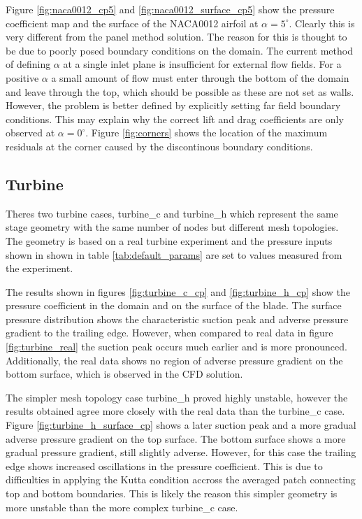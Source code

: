 \documentclass{article}
\begin{document}
Figure \ref{fig:naca0012_cp5} and \ref{fig:naca0012_surface_cp5} show the pressure coefficient map and the surface of the NACA0012 airfoil at $\alpha = 5^\circ$.
Clearly this is very different from the panel method solution.
The reason for this is thought to be due to poorly posed boundary conditions on the domain.
The current method of defining $\alpha$ at a single inlet plane is insufficient for external flow fields.
For a positive $\alpha$ a small amount of flow must enter through the bottom of the domain and leave through the top, which should be possible as these are not set as walls.
However, the problem is better defined by explicitly setting far field boundary conditions.
This may explain why the correct lift and drag coefficients are only observed at $\alpha = 0^\circ$.
Figure \ref{fig:corners} shows the location of the maximum residuals at the corner caused by the discontinous boundary conditions.

\subsection{Turbine}

Theres two turbine cases, turbine\_c and turbine\_h which represent the same stage geometry with the same number of nodes but different mesh topologies.
The geometry is based on a real turbine experiment \cite{4A3_lab} and the pressure inputs shown in shown in table \ref{tab:default_params} are set to values measured from the experiment. 

The results shown in figures \ref{fig:turbine_c_cp} and \ref{fig:turbine_h_cp} show the pressure coefficient in the domain and on the surface of the blade.
The surface pressure distribution shows the characteristic suction peak and adverse pressure gradient to the trailing edge.
However, when compared to real data in figure \ref{fig:turbine_real} the suction peak occurs much earlier and is more pronounced.
Additionally, the real data shows no region of adverse pressure gradient on the bottom surface, which is observed in the CFD solution.

The simpler mesh topology case turbine\_h proved highly unstable, however the results obtained agree more closely with the real data than the turbine\_c case.
Figure \ref{fig:turbine_h_surface_cp} shows a later suction peak and a more gradual adverse pressure gradient on the top surface.
The bottom surface shows a more gradual pressure gradient, still slightly adverse.
However, for this case the trailing edge shows increased oscillations in the pressure coefficient.
This is due to difficulties in applying the Kutta condition accross the averaged patch connecting top and bottom boundaries.
This is likely the reason this simpler geometry is more unstable than the more complex turbine\_c case.
\end{document}

